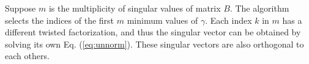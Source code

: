 Suppose $m$ is the multiplicity of singular values of matrix $B$. 
The algorithm selects the indices of the first $m$ minimum values of $\gamma$. %
Each index $k$ in $m$ has a different twisted factorization, and thus the singular vector can be obtained by solving its own Eq. (\ref{eq:unnorm}). These singular vectors are also orthogonal to each others\cite{09NLAAtwisted}.
%

